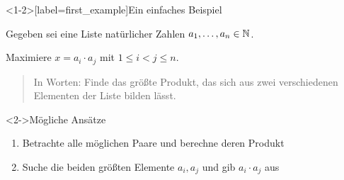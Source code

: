 
\begin{frame}<1-2>[label=first_example]{Ein einfaches Beispiel}
\begin{example}
Gegeben sei eine Liste natürlicher Zahlen $a_1, \dots, a_n \in \mathbb{N}$.

Maximiere $x = a_i \cdot a_j$ mit $1 \leq i < j \leq n$.

\begin{quote}
    In Worten: Finde das \alert{gr\"o{\ss}te} Produkt, das sich aus zwei \alert{verschiedenen} Elementen der Liste bilden lässt.
\end{quote}

\begin{block}<2->{M\"ogliche Ans\"atze}
    \begin{enumerate}
        \item Betrachte alle möglichen Paare und berechne deren Produkt
        \pause
        \item<4-> Suche die beiden gr\"o{\ss}ten Elemente $a_i, a_j$ und gib $a_i \cdot a_j$ aus
    \end{enumerate}
\end{block}
\end{example}
\end{frame}


